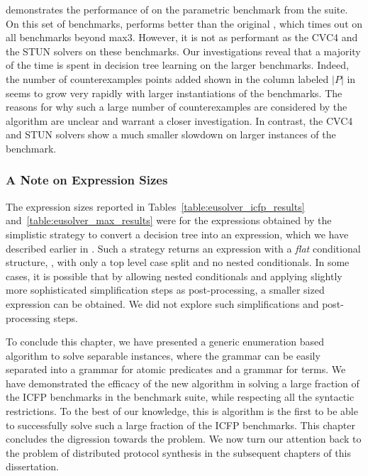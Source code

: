  demonstrates the performance of
\eusolver on the parametric  benchmark from the \sygusbody
suite. On this set of benchmarks, \eusolver performs better than the
original \esolver, which times out on all benchmarks beyond
max3. However, it is not as performant as the CVC4 and the STUN
solvers on these benchmarks. Our investigations reveal that a majority
of the time is spent in decision tree learning on the larger
 benchmarks. Indeed, the number of counterexamples points
added shown in the column labeled $|P|$ in
 seems to grow very rapidly with larger
instantiations of the  benchmarks. The reasons for why
such a large number of counterexamples are considered by the algorithm
are unclear and warrant a closer investigation.  In contrast, the CVC4
and STUN solvers show a much smaller slowdown on larger instances of
the  benchmark.

\subsubsection{A Note on Expression Sizes}
The expression sizes reported in
Tables~\ref{table:eusolver_icfp_results}
and~\ref{table:eusolver_max_results} were for the expressions obtained
by the simplistic strategy to convert a decision tree into an
expression, which we have described earlier in
. Such a strategy returns an expression
with a \emph{flat} conditional structure, \ie, with only a top level
case split and no nested conditionals. In some cases, it is possible
that by allowing nested conditionals and applying slightly more
sophisticated simplification steps as post-processing, a smaller sized
expression can be obtained. We did not explore such simplifications
and post-processing steps.

To conclude this chapter, we have presented a generic enumeration
based algorithm to solve separable \sygusbody instances, where the grammar
can be easily separated into a grammar for atomic predicates and a
grammar for terms. We have demonstrated the efficacy of the new
algorithm in solving a large fraction of the ICFP benchmarks in the
\sygusbody benchmark suite, while respecting all the syntactic
restrictions. To the best of our knowledge, this is algorithm is the
first to be able to successfully solve such a large fraction of the
ICFP benchmarks. This chapter concludes the digression towards the
\sygusbody problem. We now turn our attention back to the problem of
distributed protocol synthesis in the subsequent chapters of this
dissertation.
